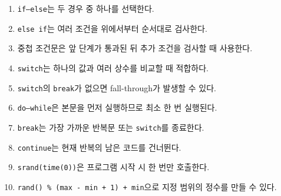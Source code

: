 \documentclass[11pt,a4paper]{article}
\begin{document}
\begin{enumerate}
    \item \texttt{if--else}는 두 경우 중 하나를 선택한다.
    \item \texttt{else if}는 여러 조건을 위에서부터 순서대로 검사한다.
    \item 중첩 조건문은 앞 단계가 통과된 뒤 추가 조건을 검사할 때 사용한다.
    \item \texttt{switch}는 하나의 값과 여러 상수를 비교할 때 적합하다.
    \item \texttt{switch}의 \texttt{break}가 없으면 fall-through가 발생할 수 있다.
    \item \texttt{do--while}은 본문을 먼저 실행하므로 최소 한 번 실행된다.
    \item \texttt{break}는 가장 가까운 반복문 또는 \texttt{switch}를 종료한다.
    \item \texttt{continue}는 현재 반복의 남은 코드를 건너뛴다.
    \item \texttt{srand(time(0))}은 프로그램 시작 시 한 번만 호출한다.
    \item \texttt{rand() \% (max - min + 1) + min}으로 지정 범위의 정수를 만들 수 있다.
\end{enumerate}
\end{document}
